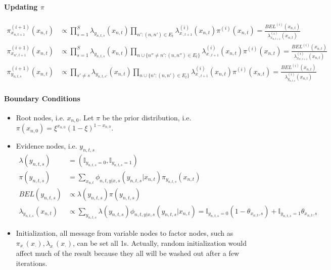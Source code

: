 \documentclass{article} %
\begin{document}
\paragraph{Updating $\pi$}
\begin{align*}
\pi_{x_{n,t+1}}^{(i+1)}(x_{n,t})&\propto \prod_{s=1}^S\lambda_{y_{n,t,s}}(x_{n,t})\prod_{n':(n,n')\in E_t}\lambda_{x_{\cdot,t+1}}^{(i)}(x_{n,t})\pi^{(i)}(x_{n,t})=\frac{BEL^{(i)}(x_{n,t})}{\lambda_{x_{n,t+1}}^{(i)}(x_{n,t})}\\
\pi_{x_{n',t+1}}^{(i+1)}(x_{n,t})&\propto \prod_{s=1}^S\lambda_{y_{n,t,s}}(x_{n,t})\prod_{n\cup\{n''\neq n':(n,n'')\in E_t\}}\lambda_{x_{\cdot,t+1}}^{(i)}(x_{n,t})\pi^{(i)}(x_{n,t})=\frac{BEL^{(i)}(x_{n,t})}{\lambda_{x_{n',t+1}}^{(i)}(x_{n,t})}\\
\pi_{y_{n,t,s}}^{(i+1)}(x_{n,t})&\propto \prod_{s'\neq s}\lambda_{y_{n,t,s'}}(x_{n,t})\prod_{n\cup\{n':(n,n')\in E_t\}}\lambda_{x_{\cdot,t+1}}^{(i)}(x_{n,t})\pi^{(i)}(x_{n,t})=\frac{BEL^{(i)}(x_{n,t})}{\lambda_{y_{n,t,s}}^{(i)}(x_{n,t})}
\end{align*}

\paragraph{Boundary Conditions}
\begin{itemize}
\item Root nodes, i.e. $x_{n,0}$. Let $\pi$ be the prior distribution, i.e. $\pi(x_{n,0})=\xi^{x_{n,0}}(1-\xi)^{1-x_{n,0}}$. 
\item Evidence nodes, i.e. $y_{n,t,s}$
\begin{align*}
\lambda(y_{n,t,s})&=(\mathbb{I}_{y_{n,t,s}=0},\mathbb{I}_{y_{n,t,s}=1}) \\
\pi(y_{n,t,s})&=\sum_{x_{n,t}}\phi_{n,t,y|x,s}(y_{n,t,s}|x_{n,t})\pi_{y_{n,t,s}}(x_{n,t})\\
BEL(y_{n,t,s})&\propto \lambda(y_{n,t,s})\pi(y_{n,t,s})\\
\lambda_{y_{n,t,s}}(x_{n,t})&\propto \sum_{y_{n,t,s}}\lambda(y_{n,t,s})\phi_{n,t,y|x,s}(y_{n,t,s}|x_{n,t})=\mathbb{I}_{y_{n,t,s}=0}(1-\theta_{x_{n,t},s})+\mathbb{I}_{y_{n,t,s}=1}\theta_{x_{n,t},s}
\end{align*}
\item Initialization, all message from variable nodes to factor nodes, such as $\pi_{x_\cdot}(x_\cdot),\lambda_{x_\cdot}(x_\cdot)$, can be set all 1s. Actually, random initialization would affect much of the result because they all will be washed out after a few iterations.
\end{itemize}
\end{document}
